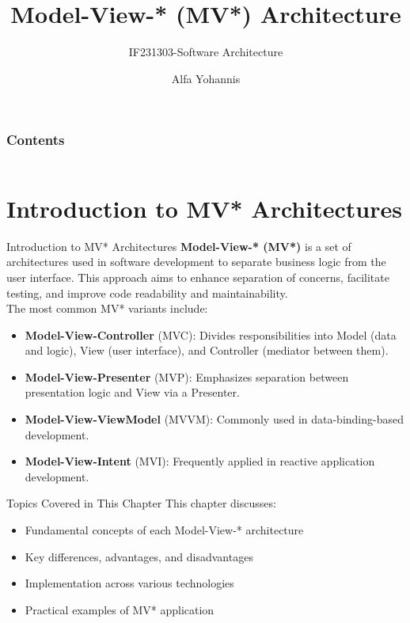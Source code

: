 \documentclass[aspectratio=169, table]{beamer}
\title{\Huge Model-View-* (MV*) Architecture\\\vspace{10pt}}
\subtitle{IF231303-Software Architecture}
\author{Alfa Yohannis}
\begin{document}
	\begin{frame}[plain]
		\maketitle
	\end{frame}

	\begin{frame}[fragile]
		\frametitle{Contents}
		
		\begin{columns}[t]
			\tableofcontents[sections={1-5}]
			
			\tableofcontents[sections={6}]
		\end{columns}
	\end{frame}

\section{Introduction to MV* Architectures}

\begin{frame}[fragile]{Introduction to MV* Architectures}
	\vspace{20pt}
	\textbf{Model-View-* (MV*)} is a set of architectures used in software development to separate business logic from the user interface. This approach aims to enhance separation of concerns, facilitate testing, and improve code readability and maintainability. \\
	The most common MV* variants include:
	\begin{itemize}
		\item \textbf{Model-View-Controller} (MVC): Divides responsibilities into Model (data and logic), View (user interface), and Controller (mediator between them).
		\item \textbf{Model-View-Presenter} (MVP): Emphasizes separation between presentation logic and View via a Presenter.
		\item \textbf{Model-View-ViewModel} (MVVM): Commonly used in data-binding-based development.
		\item \textbf{Model-View-Intent} (MVI): Frequently applied in reactive application development.
	\end{itemize}
\end{frame}

\begin{frame}[fragile]{Topics Covered in This Chapter}
	\vspace{20pt}
	This chapter discusses:
	\begin{itemize}
		\item Fundamental concepts of each Model-View-* architecture
		\item Key differences, advantages, and disadvantages
		\item Implementation across various technologies
		\item Practical examples of MV* application
	\end{itemize}
\end{frame}
\end{document}
